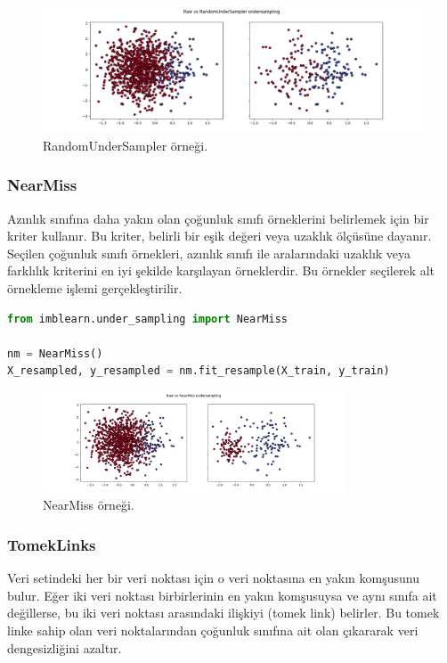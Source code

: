 \begin{figure}[h]
    \centering
    \includegraphics[width=1\textwidth]{images/Raw vs RandomUnderSampler undersampling.png}
    \caption{RandomUnderSampler örneği.}
    \label{fig:enter-label}
\end{figure}

\subsubsection{NearMiss}
Azınlık sınıfına daha yakın olan çoğunluk sınıfı örneklerini belirlemek için bir kriter kullanır. Bu kriter, belirli bir eşik değeri veya uzaklık ölçüsüne dayanır. Seçilen çoğunluk sınıfı örnekleri, azınlık sınıfı ile aralarındaki uzaklık veya farklılık kriterini en iyi şekilde karşılayan örneklerdir. Bu örnekler seçilerek alt örnekleme işlemi gerçekleştirilir.

\begin{lstlisting}[language=Python]
from imblearn.under_sampling import NearMiss

nm = NearMiss()
X_resampled, y_resampled = nm.fit_resample(X_train, y_train)
\end{lstlisting}

\begin{figure}[h]
    \centering
    \includegraphics[width=0.8\textwidth]{images/Raw vs NearMiss undersampling.png}
    \caption{NearMiss örneği.}
    \label{fig:enter-label}
\end{figure}

\subsubsection{TomekLinks}
Veri setindeki her bir veri noktası için o veri noktasına en yakın komşusunu bulur. Eğer iki veri noktası birbirlerinin en yakın komşusuysa ve aynı sınıfa ait değillerse, bu iki veri noktası arasındaki ilişkiyi (tomek link) belirler. Bu tomek linke sahip olan veri noktalarından çoğunluk sınıfına ait olan çıkararak veri dengesizliğini azaltır.

